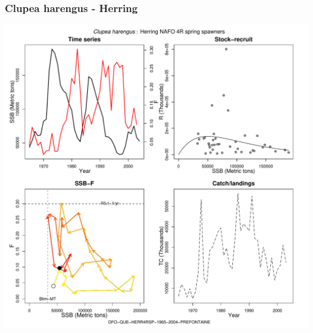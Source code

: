 \subsubsection{Clupea harengus - Herring}
\begin{center}
\includegraphics[width=1.2\textwidth]{../R/figures/DFO-QUE-HERR4RSP-1965-2004-PREFONTAINE.pdf}
\end{center}


